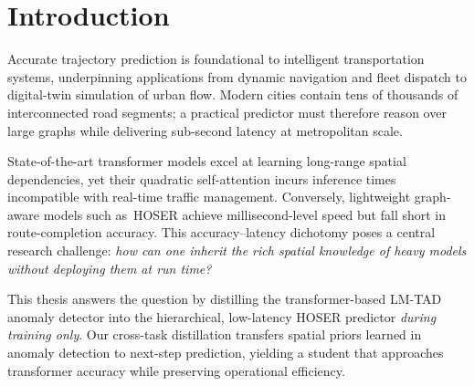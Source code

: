 \section{Introduction}
\label{sec:introduction}

Accurate trajectory prediction is foundational to intelligent transportation systems, underpinning applications from dynamic navigation and fleet dispatch to digital-twin simulation of urban flow.  Modern cities contain tens of thousands of interconnected road segments; a practical predictor must therefore reason over large graphs
while delivering sub-second latency at metropolitan scale.

State-of-the-art transformer models excel at learning long-range spatial dependencies, yet their quadratic self-attention incurs inference times incompatible with real-time traffic management.  Conversely, lightweight graph-aware models such as\ HOSER achieve millisecond-level speed but fall short in route-completion accuracy.  This accuracy–latency dichotomy poses a central research challenge: \emph{how can one inherit the rich spatial knowledge of heavy models without deploying them at run time?}

This thesis answers the question by distilling the transformer-based LM-TAD anomaly detector into the hierarchical, low-latency HOSER predictor \emph{during training only}.  Our cross-task distillation transfers spatial priors learned in anomaly detection to next-step prediction, yielding a student that approaches transformer accuracy while preserving operational efficiency.

